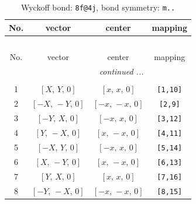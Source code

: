 \documentclass[fleqn,8pt]{jsarticle}
\begin{document}
\begin{longtable}{cccc}
\caption{Wyckoff bond: {\tt 8f@4j}, bond symmetry: {\tt m..}}
 \\
 \hline \hline
No. & vector & center & mapping \\ \hline \endfirsthead

\multicolumn{3}{l}{\tablename\ \thetable{}} \\
 \hline \hline
No. & vector & center & mapping \\ \hline \endhead

 \hline \hline
\multicolumn{3}{r}{\footnotesize\it continued ...} \\ \endfoot

 \hline \hline
\multicolumn{3}{r}{} \\ \endlastfoot

1 & $\left[ X,\, Y,\, 0 \right]$ & $\left[ x,\, x,\, 0 \right]$ & {\tt [1,10]} \\ \hline
2 & $\left[ - X,\, - Y,\, 0 \right]$ & $\left[ - x,\, - x,\, 0 \right]$ & {\tt [2,9]} \\ \hline
3 & $\left[ - Y,\, X,\, 0 \right]$ & $\left[ - x,\, x,\, 0 \right]$ & {\tt [3,12]} \\ \hline
4 & $\left[ Y,\, - X,\, 0 \right]$ & $\left[ x,\, - x,\, 0 \right]$ & {\tt [4,11]} \\ \hline
5 & $\left[ - X,\, Y,\, 0 \right]$ & $\left[ - x,\, x,\, 0 \right]$ & {\tt [5,14]} \\ \hline
6 & $\left[ X,\, - Y,\, 0 \right]$ & $\left[ x,\, - x,\, 0 \right]$ & {\tt [6,13]} \\ \hline
7 & $\left[ Y,\, X,\, 0 \right]$ & $\left[ x,\, x,\, 0 \right]$ & {\tt [7,16]} \\ \hline
8 & $\left[ - Y,\, - X,\, 0 \right]$ & $\left[ - x,\, - x,\, 0 \right]$ & {\tt [8,15]} \\
\end{longtable}
\renewcommand{\arraystretch}{1.2}
\end{document}
